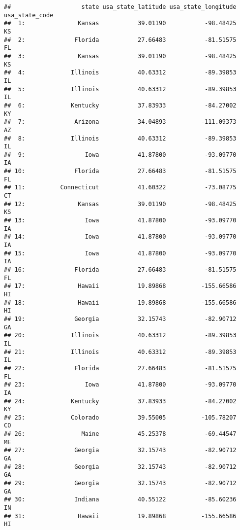 \documentclass[
]{article}
\begin{document}
\begin{verbatim}
##                    state usa_state_latitude usa_state_longitude usa_state_code
##  1:               Kansas           39.01190           -98.48425             KS
##  2:              Florida           27.66483           -81.51575             FL
##  3:               Kansas           39.01190           -98.48425             KS
##  4:             Illinois           40.63312           -89.39853             IL
##  5:             Illinois           40.63312           -89.39853             IL
##  6:             Kentucky           37.83933           -84.27002             KY
##  7:              Arizona           34.04893          -111.09373             AZ
##  8:             Illinois           40.63312           -89.39853             IL
##  9:                 Iowa           41.87800           -93.09770             IA
## 10:              Florida           27.66483           -81.51575             FL
## 11:          Connecticut           41.60322           -73.08775             CT
## 12:               Kansas           39.01190           -98.48425             KS
## 13:                 Iowa           41.87800           -93.09770             IA
## 14:                 Iowa           41.87800           -93.09770             IA
## 15:                 Iowa           41.87800           -93.09770             IA
## 16:              Florida           27.66483           -81.51575             FL
## 17:               Hawaii           19.89868          -155.66586             HI
## 18:               Hawaii           19.89868          -155.66586             HI
## 19:              Georgia           32.15743           -82.90712             GA
## 20:             Illinois           40.63312           -89.39853             IL
## 21:             Illinois           40.63312           -89.39853             IL
## 22:              Florida           27.66483           -81.51575             FL
## 23:                 Iowa           41.87800           -93.09770             IA
## 24:             Kentucky           37.83933           -84.27002             KY
## 25:             Colorado           39.55005          -105.78207             CO
## 26:                Maine           45.25378           -69.44547             ME
## 27:              Georgia           32.15743           -82.90712             GA
## 28:              Georgia           32.15743           -82.90712             GA
## 29:              Georgia           32.15743           -82.90712             GA
## 30:              Indiana           40.55122           -85.60236             IN
## 31:               Hawaii           19.89868          -155.66586             HI

\end{verbatim}
\end{document}
